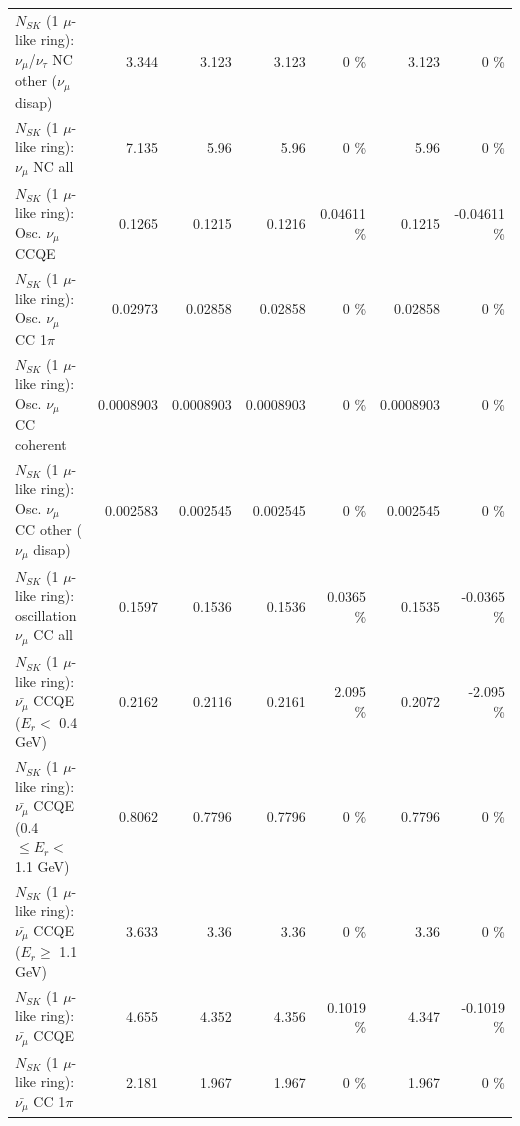 \begin{table}
\begin{tabular}{| l | r | r | r  r | r  r |}
   $N_{SK}$ (1 $\mu$-like ring): $\nu_\mu$/$\nu_\tau$ NC other ($\nu_\mu$ disap) &           3.344 &           3.123 &           3.123 &        0 \%  &           3.123 &        0 \%  \\ 
                                $N_{SK}$ (1 $\mu$-like ring): $\nu_{\mu}$ NC all &           7.135 &            5.96 &            5.96 &        0 \%  &            5.96 &        0 \%  \\ 
\hline
\hline
                               $N_{SK}$ (1 $\mu$-like ring): Osc. $\nu_\mu$ CCQE &          0.1265 &          0.1215 &          0.1216 &  0.04611 \%  &          0.1215 & -0.04611 \%  \\ 
                          $N_{SK}$ (1 $\mu$-like ring): Osc. $\nu_\mu$ CC 1$\pi$ &         0.02973 &         0.02858 &         0.02858 &        0 \%  &         0.02858 &        0 \%  \\ 
                        $N_{SK}$ (1 $\mu$-like ring): Osc. $\nu_\mu$ CC coherent &       0.0008903 &       0.0008903 &       0.0008903 &        0 \%  &       0.0008903 &        0 \%  \\ 
         $N_{SK}$ (1 $\mu$-like ring): Osc. $\nu_\mu$ CC other ($\nu_\mu$ disap) &        0.002583 &        0.002545 &        0.002545 &        0 \%  &        0.002545 &        0 \%  \\ 
                      $N_{SK}$ (1 $\mu$-like ring): oscillation $\nu_\mu$ CC all &          0.1597 &          0.1536 &          0.1536 &   0.0365 \%  &          0.1535 &  -0.0365 \%  \\ 
\hline
\hline
          $N_{SK}$ (1 $\mu$-like ring): $\bar{\nu_\mu}$ CCQE ($E_{r} <$ 0.4 GeV) &          0.2162 &          0.2116 &          0.2161 &    2.095 \%  &          0.2072 &   -2.095 \%  \\ 
 $N_{SK}$ (1 $\mu$-like ring): $\bar{\nu_\mu}$ CCQE (0.4 $\leq E_{r} <$ 1.1 GeV) &          0.8062 &          0.7796 &          0.7796 &        0 \%  &          0.7796 &        0 \%  \\ 
       $N_{SK}$ (1 $\mu$-like ring): $\bar{\nu_\mu}$ CCQE ($E_{r} \geq$ 1.1 GeV) &           3.633 &            3.36 &            3.36 &        0 \%  &            3.36 &        0 \%  \\ 
\hline
                              $N_{SK}$ (1 $\mu$-like ring): $\bar{\nu_\mu}$ CCQE &           4.655 &           4.352 &           4.356 &   0.1019 \%  &           4.347 &  -0.1019 \%  \\ 
                         $N_{SK}$ (1 $\mu$-like ring): $\bar{\nu_\mu}$ CC 1$\pi$ &           2.181 &           1.967 &           1.967 &        0 \%  &           1.967 &        0 \%  \\ 

\end{tabular}
\end{table}
